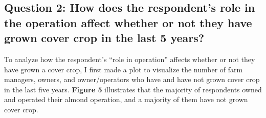 \documentclass[12pt,]{article}
\begin{document}
\subsection{Question 2: How does the respondent's role in the operation
affect whether or not they have grown cover crop in the last 5
years?}\label{question-2-how-does-the-respondents-role-in-the-operation-affect-whether-or-not-they-have-grown-cover-crop-in-the-last-5-years}

To analyze how the respondent's ``role in operation'' affects whether or
not they have grown a cover crop, I first made a plot to visualize the
number of farm managers, owners, and owner/operators who have and have
not grown cover crop in the last five years. \textbf{Figure 5}
illustrates that the majority of respondents owned and operated their
almond operation, and a majority of them have not grown cover crop.

  \providecommand{\huxb}[2]{\arrayrulecolor[RGB]{#1}\global\arrayrulewidth=#2pt}
  \providecommand{\huxvb}[2]{\color[RGB]{#1}\vrule width #2pt}
  \providecommand{\huxtpad}[1]{\rule{0pt}{\baselineskip+#1}}
  \providecommand{\huxbpad}[1]{\rule[-#1]{0pt}{#1}}
\end{document}
